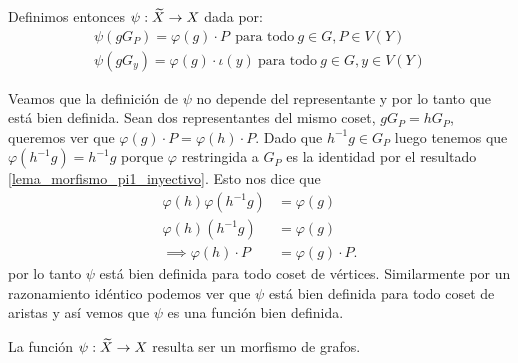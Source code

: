 \documentclass[tesis.tex]{subfiles}
\begin{document}
Definimos entonces $\psi: \widetilde X \to X$ dada por: 
\begin{align*}
	\psi(g G_P ) = \varphi(g) \cdot P \ \ \text{para todo} \ g \in G, P \in V(Y) \\
	\psi(g G_y ) = \varphi(g) \cdot \iota(y) \ \text{para todo} \ g \in G, y \in V(Y)
\end{align*}

Veamos que la definición de $\psi$ no depende del representante y por lo tanto que está bien definida.
Sean dos representantes del mismo coset, $gG_{P} = hG_{P}$, queremos ver que $\varphi(g) \cdot P = \varphi(h) \cdot P$.
Dado que $h^{-1}g \in G_P$ luego tenemos que $\varphi(h^{-1}g) = h^{-1}g$ porque $\varphi$ restringida a $G_P$ es la identidad por el resultado \ref{lema_morfismo_pi1_inyectivo}.
Esto nos dice que 
\begin{align*}
		\varphi(h) \varphi(h^{-1}g) &= \varphi(g) \\
		\varphi(h) (h^{-1}g) & = \varphi(g) \\
		\implies \varphi(h) \cdot P &= \varphi(g) \cdot P.
\end{align*}
por lo tanto $\psi$ está bien definida para todo coset de vértices.
Similarmente por un razonamiento idéntico podemos ver que $\psi$ está bien definida para todo coset de aristas y así vemos que $\psi$ es una función bien definida.

\begin{lema}
	La función $\psi: \widetilde X \to X$ resulta ser un morfismo de grafos.
\end{lema}
\end{document}
